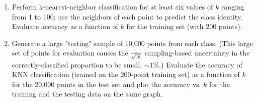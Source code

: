 \documentclass[12pt]{book}
\theoremstyle{definition}
\begin{document}
\begin{enumerate}
\item
Perform k-nearest-neighbor classification for at least six values of $k$ ranging from 1 to 100; use the neighbors of each point to predict the class identity.  Evaluate accuracy as a function of $k$ for the training set (with 200 points).

\item
Generate a large "testing" sample of 10,000 points from each class.  (This large set of points for evaluation causes the ${1 \over \sqrt{N} }$ sampling-based uncertainty in the correctly-classified proportion to be small, $ \sim 1\%$.) Evaluate the accuracy of KNN classification (trained on the 200-point training set)  as a function of $k$ for the 20,000 points in the test set and plot the accuracy vs. $k$ for the training and the testing data on the same graph.   








\end{enumerate}
\end{document}
